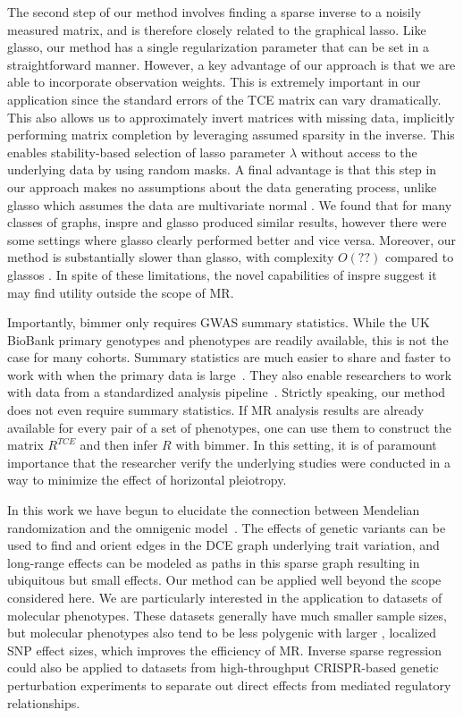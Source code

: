 \documentclass{article}
\begin{document}
The second step of our method involves finding a sparse inverse to a noisily measured
matrix, and is therefore closely related to the graphical lasso. Like glasso, our method
 has a single regularization parameter that can be set in a straightforward manner.
However, a key advantage of our approach is that we are able to incorporate
observation weights. This is extremely important in our application since the standard errors
of the TCE matrix can vary dramatically. This also allows us to approximately invert matrices
with missing data, implicitly performing matrix completion by leveraging assumed
sparsity in the inverse. This enables stability-based selection of lasso parameter $\lambda$ without access to the underlying data by using random masks.
A final advantage is that this step in our approach makes no
assumptions about the data generating process, unlike glasso which assumes the data are
multivariate normal . We found that for many classes of graphs,
inspre and glasso produced similar results, however there were some settings where glasso
clearly performed better and vice versa.
Moreover, our method is substantially slower than glasso, with
complexity $O(??)$ compared to glassos . In spite of these limitations,
the novel capabilities of inspre suggest it may find utility
outside the scope of MR.

Importantly, bimmer only requires GWAS summary statistics.
While the UK BioBank primary genotypes and phenotypes are readily available, this is not the case for many cohorts. Summary
statistics are much easier  to share and faster to work with when the primary
data is large~\cite{Pasaniuc2017}. They also enable researchers to work with data from a
standardized analysis pipeline~\cite{NealeUKBB}.
Strictly speaking, our method does not even require summary statistics. If
MR analysis results are already available for every pair of a set of phenotypes,
one can use them to construct the matrix $R^{TCE}$ and then infer $R$ with
bimmer. In this setting, it is of paramount importance that the researcher verify
the underlying studies were conducted in a way to minimize the effect of
horizontal pleiotropy.

In this work we have begun to elucidate the connection between Mendelian randomization
and the omnigenic model~\cite{Boyle2017}. The effects of genetic variants
can be used to find and orient edges
in the DCE graph underlying trait variation, and long-range effects can be modeled
as paths in this sparse graph resulting in ubiquitous but small effects.
 Our method can be applied well beyond the scope considered
here. We are particularly interested in the application to datasets of molecular phenotypes.
These datasets generally have much smaller sample sizes, but molecular phenotypes also
tend to be less polygenic with larger , localized SNP effect sizes, which improves the efficiency
of MR. Inverse sparse regression could also be applied to datasets from high-throughput CRISPR-based
genetic perturbation experiments to separate out direct effects from mediated regulatory relationships. 
\end{document}
